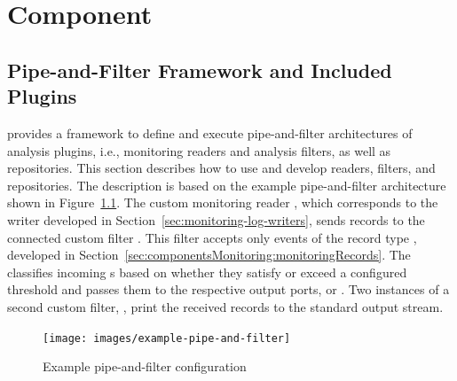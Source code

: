 %

\chapter{\KiekerAnalysisPart{} Component}\label{chap:componentsAnalysis}


\section{Pipe-and-Filter Framework and Included Plugins}\label{sec:analysis:controller}

\KiekerAnalysisPart{} provides a framework to define and execute pipe-and-filter %
architectures of analysis plugins, i.e., monitoring readers and analysis filters, %
as well as repositories. %
This section describes how to use and develop readers, filters, and %
repositories. The description is based on the example %
pipe-and-filter architecture shown in Figure~\ref{fig:example:pipe-and-filter}. The custom monitoring reader %
, which corresponds to the writer developed in Section~\ref{sec:monitoring-log-writers}, %
sends records to the connected custom filter . %
This filter accepts only events of the record type ,
developed in Section~\ref{sec:componentsMonitoring:monitoringRecords}. %
The  classifies incoming s %
based on whether they satisfy or exceed a configured threshold and passes them %
to the respective output ports,  or . %
Two instances of a second custom filter, , %
print the received records to the standard output stream.

\begin{figure}
\texttt{[image: images/example-pipe-and-filter]}
\caption{Example pipe-and-filter configuration}
\label{fig:example:pipe-and-filter}
\end{figure}


